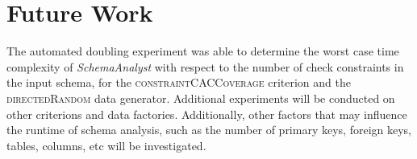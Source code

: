 \documentclass[smallextended]{svjour3}       %
\begin{document}
\section{Future Work}
The automated doubling experiment was able to determine the worst case
time complexity of \textit{SchemaAnalyst} with respect to the number of
check constraints in the input schema, for the
\textsc{constraintCACCoverage} criterion and the
\textsc{directedRandom} data generator.  Additional experiments will be
conducted on other criterions and data factories. Additionally, other factors 
that may influence the runtime of schema analysis,
such as the number of primary keys, foreign keys, tables, columns, etc
will be investigated.


\end{document}
